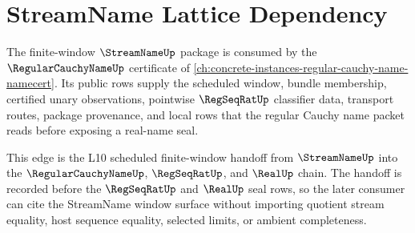 \section{StreamName Lattice Dependency}
\label{sec:streamname-lattice-dependency}

The finite-window $\StreamNameUp$ package is consumed by the $\RegularCauchyNameUp$ certificate of \autoref{ch:concrete-instances-regular-cauchy-name-namecert}. Its public rows supply the scheduled window, bundle membership, certified unary observations, pointwise $\RegSeqRatUp$ classifier data, transport routes, package provenance, and local \NameCert{} rows that the regular Cauchy name packet reads before exposing a real-name seal.

This edge is the L10 scheduled finite-window handoff from $\StreamNameUp$ into the $\RegularCauchyNameUp$, $\RegSeqRatUp$, and $\RealUp$ chain. The handoff is recorded before the $\RegSeqRatUp$ and $\RealUp$ seal rows, so the later consumer can cite the StreamName window surface without importing quotient stream equality, host sequence equality, selected limits, or ambient completeness.

